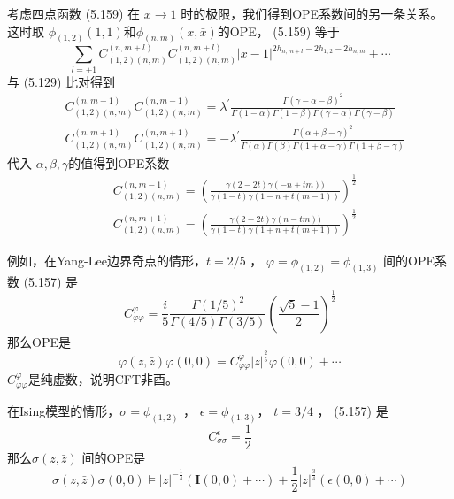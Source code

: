 考虑四点函数 (5.159) 在 $x\to 1$ 时的极限，我们得到OPE系数间的另一条关系。这时取 $\phi_{(1,2)}(1,1) 和 \phi_{(n, m)}(x, \bar{x}) $的OPE， (5.159) 等于
\begin{equation}
	\sum_{l=\pm 1} C_{(1,2)(n, m)}^{(n, m+l)} C_{(1,2)(n, m)}^{(n, m+l)}|x-1|^{2 h_{n, m+l}-2 h_{1,2}-2 h_{n, m}}+\cdots 
\end{equation}
与 (5.129) 比对得到
\begin{align} &C_{(1,2)(n, m)}^{(n, m-1)} C_{(1,2)(n, m)}^{(n, m-1)}=\lambda^{\prime} \frac{\Gamma(\gamma-\alpha-\beta)^{2}}{\Gamma(1-\alpha) \Gamma(1-\beta) \Gamma(\gamma-\alpha) \Gamma(\gamma-\beta)}\\ &C_{(1,2)(n, m)}^{(n, m+1)} C_{(1,2)(n, m)}^{(n, m+1)}=-\lambda^{\prime} \frac{\Gamma(\alpha+\beta-\gamma)^{2}}{\Gamma(\alpha) \Gamma(\beta) \Gamma(1+\alpha-\gamma) \Gamma(1+\beta-\gamma)} \end{align}
代入 $\alpha,\beta,\gamma $的值得到OPE系数
\begin{align} &C_{(1,2)(n, m)}^{(n, m-1)}=\left(\frac{\gamma(2-2 t) \gamma(-n+t m))}{\gamma(1-t) \gamma(1-n+t(m-1))}\right)^{\frac{1}{2}} \\ &C_{(1,2)(n, m)}^{(n, m+1)}=\left(\frac{\gamma(2-2 t) \gamma(n-t m))}{\gamma(1-t) \gamma(1+n+t(m+1))}\right)^{\frac{1}{2}} \end{align}

例如，在Yang-Lee边界奇点的情形，$ t=2/5$ ， $\varphi=\phi_{(1,2)}=\phi_{(1,3)}$ 间的OPE系数 (5.157) 是
\begin{equation}
	C_{\varphi \varphi}^{\varphi}=\frac{i}{5} \frac{\Gamma\left(1/5\right)^2}{\Gamma\left(4/5\right) \Gamma\left(3/5\right)}\left(\frac{\sqrt{5}-1}{2}\right)^{\frac{1}{2}}
\end{equation}
那么OPE是
\begin{equation}
	\varphi(z, \bar{z}) \varphi(0,0)=C_{\varphi \varphi}^{\varphi}|z|^{\frac{2}{5}} \varphi(0,0)+\cdots
\end{equation}
$C_{\varphi \varphi}^{\varphi} $是纯虚数，说明CFT非酉。

在Ising模型的情形，$ \sigma=\phi_{(1,2)}$ ， $\epsilon=\phi_{(1,3)} $， $t=3/4$ ， (5.157) 是
\begin{equation}
	C_{\sigma \sigma}^{\epsilon}=\frac{1}{2}
\end{equation} 
那么$ \sigma(z, \bar{z})$ 间的OPE是
\begin{equation}
	\sigma(z, \bar{z}) \sigma(0,0) \models|z|^{-\frac{1}{4}}(\boldsymbol{I}(0,0)+\cdots)+\frac{1}{2}|z|^{\frac{3}{4}}(\epsilon(0,0)+\cdots)
\end{equation}

